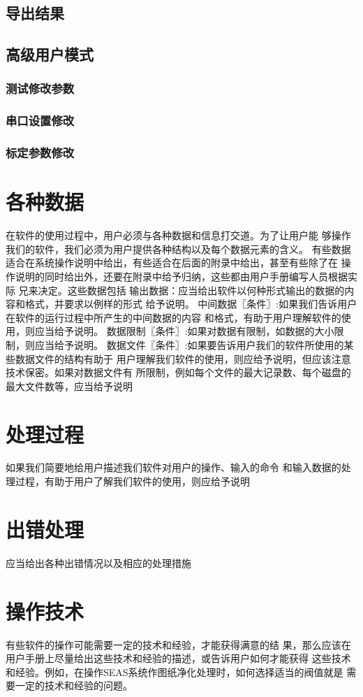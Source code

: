 \subsection{导出结果}
\subsection{高级用户模式\label{subsec:advancedUser}}
\subsubsection*{测试修改参数}
\subsubsection*{串口设置修改}
\subsubsection*{标定参数修改}
\section{各种数据}在软件的使用过程中，用户必须与各种数据和信息打交道。为了让用户能
够操作我们的软件，我们必须为用户提供各种结构以及每个数据元素的含义。
有些数据适合在系统操作说明中给出，有些适合在后面的附录中给出，甚至有些除了在
操作说明的同时给出外，还要在附录中给予归纳，这些都由用户手册编写人员根据实际
兄来决定。这些数据包括
输出数据：应当给出软件以何种形式输出的数据的内容和格式，并要求以例样的形式
给予说明。
中间数据〖条件〗:如果我们告诉用户在软件的运行过程中所产生的中间数据的内容
和格式，有助于用户理解软件的使用，则应当给予说明。
数据限制〖条件〗:如果对数据有限制，如数据的大小限制，则应当给予说明。
数据文件〖条件〗:如果要告诉用户我们的软件所使用的某些数据文件的结构有助于
用户理解我们软件的使用，则应给予说明，但应该注意技术保密。如果对数据文件有
所限制，例如每个文件的最大记录数、每个磁盘的最大文件数等，应当给予说明
\section{处理过程}
如果我们简要地给用户描述我们软件对用户的操作、输入的命令
和输入数据的处理过程，有助于用户了解我们软件的使用，则应给予说明
\section{出错处理}
应当给出各种出错情况以及相应的处理措施
\section{操作技术}
有些软件的操作可能需要一定的技术和经验，才能获得满意的结
果，那么应该在用户手册上尽量给出这些技术和经验的描述，或告诉用户如何才能获得
这些技术和经验。例如，在操作SEAS系统作图纸净化处理时，如何选择适当的阀值就是
需要一定的技术和经验的问题。